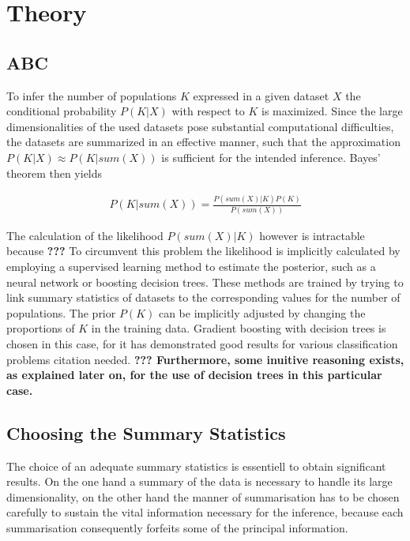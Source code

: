 \documentclass[a4paper, 11pt]{article}
\begin{document}
\newpage

\section{Theory}

\subsection{ABC}

To infer the number of populations $K$ expressed in a given dataset $X$ the conditional probability $P(K | X)$ with respect to $K$ is maximized. Since the large dimensionalities of the used datasets pose substantial computational difficulties, the datasets are summarized  in an effective manner, such that the approximation $P(K|X) \approx P(K | sum(X))$ is sufficient for the intended inference. Bayes' theorem then yields

\begin{align*}
P(K | sum(X)) = \frac{P(sum(X) | K) P(K)}{P(sum(X))}
\end{align*}

The calculation of the likelihood $P(sum(X) | K)$ however is intractable because \textbf{???}
To circumvent this problem the likelihood is implicitly calculated by employing a supervised learning method to estimate the posterior, such as a neural network or boosting decision trees. These methods are trained by trying to link summary statistics of datasets to the corresponding values for the number of populations. The prior $P(K)$ 
can be implicitly adjusted by changing the proportions of $K$ in the training data. Gradient boosting with decision trees is chosen in this case, for it has demonstrated good results for various classification problems citation needed. \textbf{??? Furthermore, some inuitive reasoning exists, as explained later on, for the use of decision trees in this particular case.}

\subsection{Choosing the Summary Statistics}

The choice of an adequate summary statistics is essentiell to obtain significant results. On the one hand a summary of the data is necessary to handle its large dimensionality, on the other hand the manner of summarisation has to be chosen carefully to sustain the vital information necessary for the inference, because each summarisation consequently forfeits some of the principal information. 
\end{document}
